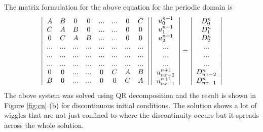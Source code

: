 The matrix formulation for the above equation for the periodic domain is 
\[
\left| \begin{array}{ccc ccccc}
A & B & 0 & 0 & ... & ... & 0 & C \\
C & A & B & 0 & ... & ... & 0 & 0 \\
0 & C & A & B & ... & ... & 0 & 0\\
... & ... & ... & ... & ... & ... & ... & ...\\
... & ... & ... & ... & ... & ... & ... & ...\\
... & ... & ... & ... & ... & ... & ... & ...\\
0 & 0 & ... & ... & 0 & C & A & B\\
B & 0 & ... & ... & 0 & 0 & C & A\\
\end{array} \right|
\left| \begin{array}{c}
u_{0}^{n+1} \\
u_{1}^{n+1} \\
u_{2}^{n+1} \\
...\\
...\\
...\\
u_{nx-2}^{n+1}\\
u_{nx-1}^{n+1}\\
\end{array} \right|
=
\left| \begin{array}{c}
D_{0}^{n} \\
D_{1}^{n} \\
D_{2}^{n} \\
...\\
...\\
...\\
D_{nx-2}^{n} \\
D_{nx-1}^{n} \\
\end{array} \right|
\]
The above system was solved using QR decomposition and the result is shown in Figure \ref{fig:cn} (b) for discontinuous initial conditions. The solution shows a lot of wiggles that are not just confined to where the discontinuity occurs but it spreads across the whole solution.

